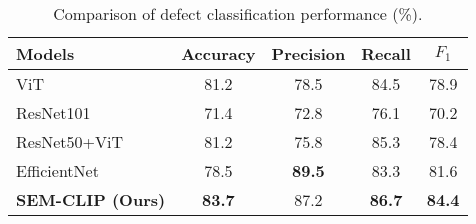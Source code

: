 \begin{table}[tb!]
    \centering
    \caption{Comparison of defect classification performance (\%).}
    \resizebox{0.82\linewidth}{!}
    {
        \begin{threeparttable}
            {
                \begin{tabular}{l|c|c|c|c}
                    \toprule
                    Models & Accuracy & Precision & Recall  & $F_{1}$ \\
                    \midrule
                    ViT \cite{dosovitskiy2020image} & 81.2  & 78.5 & 84.5 & 78.9 \\
                    ResNet101 \cite{he2016deep}  & 71.4  & 72.8 & 76.1 & 70.2 \\
                    ResNet50+ViT \cite{dosovitskiy2020image} & 81.2 & 75.8 & 85.3 & 78.4 \\
                    EfficientNet \cite{tan2019efficientnet}  & 78.5  & \textbf{89.5} & 83.3 & 81.6 \\
                    \midrule
                   \textbf{SEM-CLIP (Ours)} & \textbf{83.7} & 87.2 & \textbf{86.7} & \textbf{84.4} \\
                    \bottomrule
                \end{tabular}
            }
        \end{threeparttable}
    }
    \label{few-shot-class}
\end{table}



